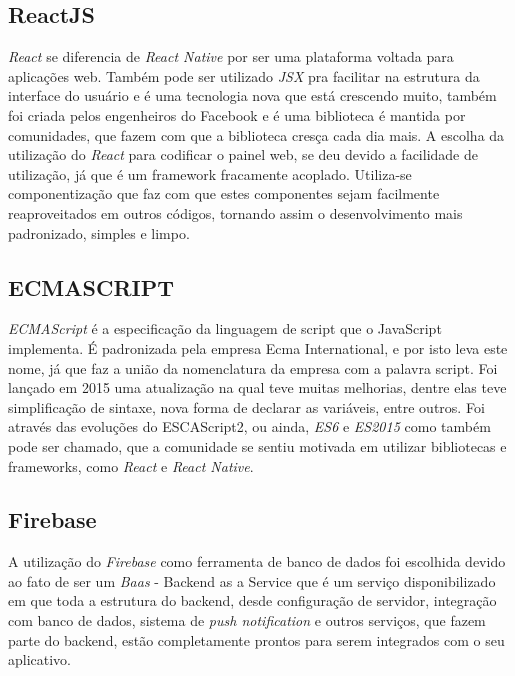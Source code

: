 \subsection{ReactJS}
\textit{React} se diferencia de \textit{React Native} por ser uma plataforma voltada para aplicações web. Também pode ser utilizado \textit{JSX} pra facilitar na estrutura da interface do usuário e é uma tecnologia nova que está crescendo muito, também foi criada pelos engenheiros do Facebook e é uma biblioteca é mantida por comunidades, que fazem com que a biblioteca cresça cada dia mais. A escolha da utilização do \textit{React} para codificar o painel web, se deu devido a facilidade de utilização, já que é um framework fracamente acoplado. Utiliza-se componentização que faz com que estes componentes sejam facilmente reaproveitados em outros códigos, tornando assim o desenvolvimento mais padronizado, simples e limpo.

\subsection{ECMASCRIPT}

\textit{ECMAScript} é a especificação da linguagem de script que o JavaScript implementa. É padronizada pela empresa Ecma International, e por isto leva este nome, já que faz a união da nomenclatura da empresa com a palavra script. Foi lançado em 2015 uma atualização na qual teve muitas melhorias, dentre elas teve simplificação de sintaxe, nova forma de declarar as variáveis, entre outros. \cite{ecma}
Foi através das evoluções do ESCAScript2, ou ainda, \textit{ES6} e \textit{ES2015} como também pode ser chamado, que a comunidade se sentiu motivada em utilizar bibliotecas e frameworks, como \textit{React} e \textit{React Native}. 

\subsection{Firebase}
A utilização do \textit{Firebase} como ferramenta de banco de dados foi escolhida devido ao fato de ser um \textit{Baas} - Backend as a Service que é um serviço disponibilizado em que toda a estrutura do backend, desde configuração de servidor, integração com banco de dados, sistema de \textit{push notification} e outros serviços, que fazem parte do backend, estão completamente prontos para serem integrados com o seu aplicativo. 



